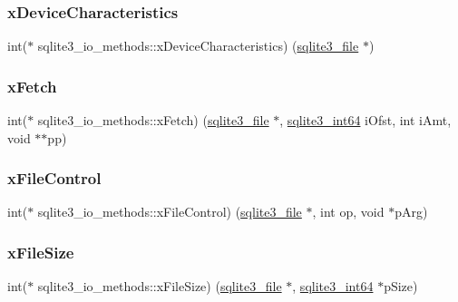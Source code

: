 \subsubsection{\texorpdfstring{xDeviceCharacteristics}{xDeviceCharacteristics}}
{\footnotesize\ttfamily int($\ast$ sqlite3\+\_\+io\+\_\+methods\+::x\+Device\+Characteristics) (\mbox{\hyperlink{structsqlite3__file}{sqlite3\+\_\+file}} $\ast$)}

\mbox{\label{structsqlite3__io__methods_a71e611fc755d95ffbd3e7ecb8cb5fae6}} 
\subsubsection{\texorpdfstring{xFetch}{xFetch}}
{\footnotesize\ttfamily int($\ast$ sqlite3\+\_\+io\+\_\+methods\+::x\+Fetch) (\mbox{\hyperlink{structsqlite3__file}{sqlite3\+\_\+file}} $\ast$, \mbox{\hyperlink{sqlite3_8h_a0a4d3e6c1ad46f90e746b920ab6ca0d2}{sqlite3\+\_\+int64}} i\+Ofst, int i\+Amt, void $\ast$$\ast$pp)}

\mbox{\label{structsqlite3__io__methods_a913b12deb1dcae2c61b90776bcd9d19c}} 
\subsubsection{\texorpdfstring{xFileControl}{xFileControl}}
{\footnotesize\ttfamily int($\ast$ sqlite3\+\_\+io\+\_\+methods\+::x\+File\+Control) (\mbox{\hyperlink{structsqlite3__file}{sqlite3\+\_\+file}} $\ast$, int op, void $\ast$p\+Arg)}

\mbox{\label{structsqlite3__io__methods_ae875f158de72435f40ca0bd5207d9862}} 
\subsubsection{\texorpdfstring{xFileSize}{xFileSize}}
{\footnotesize\ttfamily int($\ast$ sqlite3\+\_\+io\+\_\+methods\+::x\+File\+Size) (\mbox{\hyperlink{structsqlite3__file}{sqlite3\+\_\+file}} $\ast$, \mbox{\hyperlink{sqlite3_8h_a0a4d3e6c1ad46f90e746b920ab6ca0d2}{sqlite3\+\_\+int64}} $\ast$p\+Size)}

